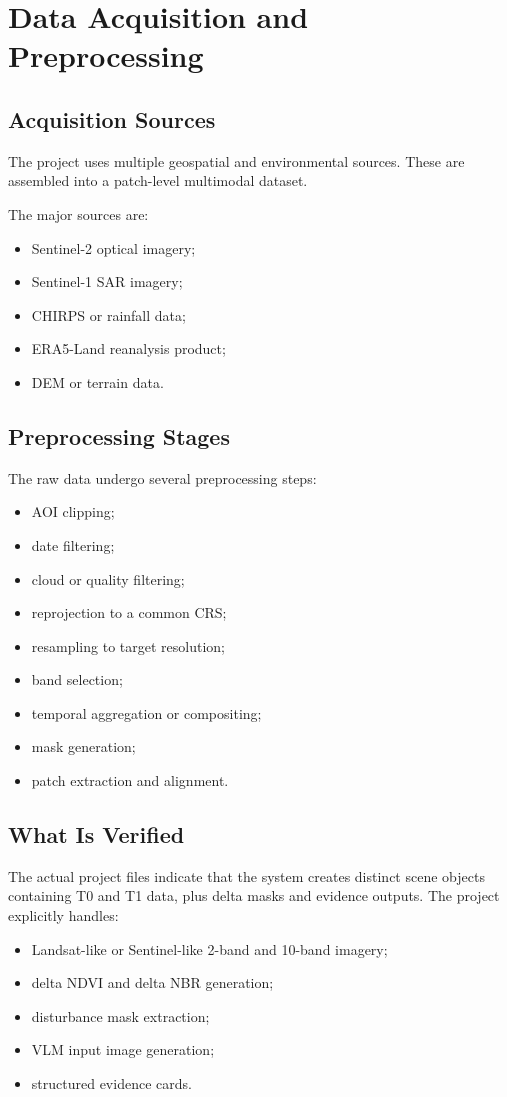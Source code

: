 \documentclass[11pt]{article}
\begin{document}
\section{Data Acquisition and Preprocessing}

\subsection{Acquisition Sources}
The project uses multiple geospatial and environmental sources. These are assembled into a patch-level multimodal dataset.

The major sources are:
\begin{itemize}
    \item Sentinel-2 optical imagery;
    \item Sentinel-1 SAR imagery;
    \item CHIRPS or rainfall data;
    \item ERA5-Land reanalysis product;
    \item DEM or terrain data.
\end{itemize}

\subsection{Preprocessing Stages}
The raw data undergo several preprocessing steps:
\begin{itemize}
    \item AOI clipping;
    \item date filtering;
    \item cloud or quality filtering;
    \item reprojection to a common CRS;
    \item resampling to target resolution;
    \item band selection;
    \item temporal aggregation or compositing;
    \item mask generation;
    \item patch extraction and alignment.
\end{itemize}

\subsection{What Is Verified}
The actual project files indicate that the system creates distinct scene objects containing T0 and T1 data, plus delta masks and evidence outputs. The project explicitly handles:
\begin{itemize}
    \item Landsat-like or Sentinel-like 2-band and 10-band imagery;
    \item delta NDVI and delta NBR generation;
    \item disturbance mask extraction;
    \item VLM input image generation;
    \item structured evidence cards.
\end{itemize}
\end{document}
